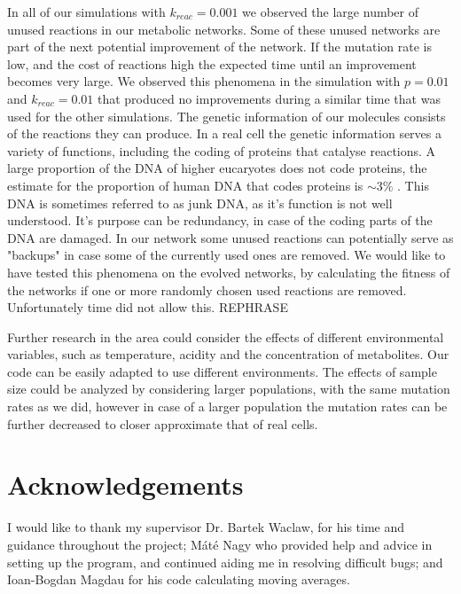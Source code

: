 \documentclass[a4paper,12pt]{article}
\begin{document}
	In all of our simulations with $k_{reac}=0.001$ we observed the large number of unused reactions in our metabolic networks. Some of these unused networks are part of the next potential improvement of the network. If the mutation rate is low, and the cost of reactions high the expected time until an improvement becomes very large. We observed this phenomena in the simulation with $p=0.01$ and $k_{reac}=0.01$ that produced no improvements during a similar time that was used for the other simulations. The genetic information of our molecules consists of the reactions they can produce. In a real cell the genetic information serves a variety of functions, including the coding of proteins that catalyse reactions. A large proportion of the DNA of higher eucaryotes does not code proteins, the estimate for the proportion of human DNA that codes proteins is $\sim 3\%$ \cite{junkdna}. This DNA is sometimes referred to as junk DNA, as it's function is not well understood. It's purpose can be redundancy, in case of the coding parts of the DNA are damaged. In our network some unused reactions can potentially serve as "backups" in case some of the currently used ones are removed. We would like to have tested this phenomena on the evolved networks, by calculating the fitness of the networks if one or more randomly chosen used reactions are removed. Unfortunately time did not allow this.  REPHRASE
	
	
	
	Further research in the area could consider the effects of different environmental variables, such as temperature, acidity and the concentration of metabolites. Our code can be easily adapted to use different environments. The effects of sample size could be analyzed by considering larger populations, with the same mutation rates as we did, however in case of a larger population the mutation rates can be further decreased to closer approximate that of real cells. 
	
	
	\section*{Acknowledgements}
	
	I would like to thank my supervisor Dr. Bartek Waclaw, for his time and guidance throughout the project; Máté Nagy who provided help and advice in setting up the program, and continued aiding me in resolving difficult bugs; and Ioan-Bogdan Magdau for his code calculating moving averages. 

	
	

\end{document}
